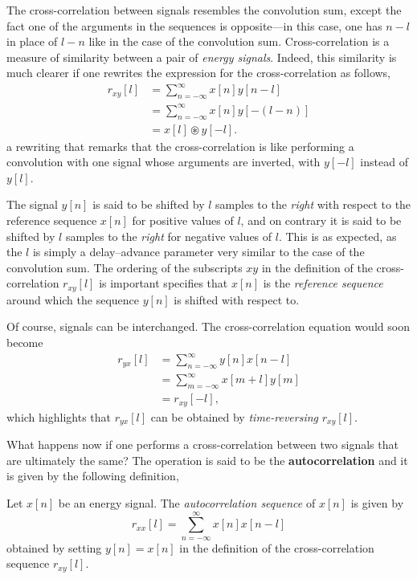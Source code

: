 \documentclass[\documentfontsize, twocolumn]{\classname}
\begin{document}
The cross-correlation between signals resembles the convolution sum, except the fact one of the arguments in the sequences is opposite---in this case, one has $n-l$ in place of $l - n$ like in the case of the convolution sum. Cross-correlation is a measure of similarity between a pair of \emph{energy signals}. Indeed, this similarity is much clearer if one rewrites the expression for the cross-correlation as follows,
\begin{align*}
    r_{xy}[l] &= \sum_{n=-\infty}^\infty x[n]y[n-l]\\
              &= \sum_{n=-\infty}^\infty x[n]y[-(l-n)]\\
              &= x[l] \circledast y[-l].
\end{align*}
a rewriting that remarks that the cross-correlation is like performing a convolution with one signal whose arguments are inverted, with $y[-l]$ instead of $y[l]$.


The signal $y[n]$ is said to be shifted by $l$ samples to the \emph{right} with respect to the reference sequence $x[n]$ for positive values of $l$, and on contrary it is said to be shifted by $l$ samples to the \emph{right} for negative values of $l$. This is as expected, as the $l$ is simply a delay--advance parameter very similar to the case of the convolution sum. The ordering of the subscripts $xy$ in the definition of the cross-correlation $r_{xy}[l]$ is important specifies that $x[n]$ is the \emph{reference sequence} around which the sequence $y[n]$ is shifted with respect to.

Of course, signals can be interchanged. The cross-correlation equation would soon become
\begin{align*}
    r_{yx}[l] &= \sum_{n=-\infty}^\infty y[n]x[n-l]\\
              &= \sum_{m=-\infty}^\infty x[m+l]y[m]\\
              &= r_{xy}[-l],
\end{align*}
which highlights that $r_{yx}[l]$ can be obtained by \emph{time-reversing} $r_{xy}[l]$.

What happens now if one performs a cross-correlation between two signals that are ultimately the same? The operation is said to be the \textbf{autocorrelation} and it is given by the following definition,
\begin{defin}[Autocorrelation]
    Let $x[n]$ be an energy signal. The \emph{autocorrelation sequence} of $x[n]$ is given by
    \begin{equation}\label{eqn:autocorrelation}
        r_{xx}[l] = \sum_{n=-\infty}^\infty x[n]x[n-l]
    \end{equation}
    obtained by setting $y[n]=x[n]$ in the definition of the cross-correlation sequence $r_{xy}[l]$.
\end{defin}
\end{document}

